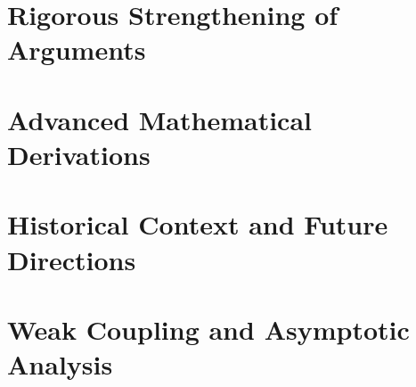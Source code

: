 \documentclass[11pt,a4paper]{report}
\begin{document}
\chapter{Rigorous Strengthening of Arguments}
\label{ch:fortification}








\chapter{Advanced Mathematical Derivations}
\label{ch:advanced}



\chapter{Historical Context and Future Directions}
\label{ch:future}




\chapter{Weak Coupling and Asymptotic Analysis}
\label{ch:weak-coupling}



\end{document}
